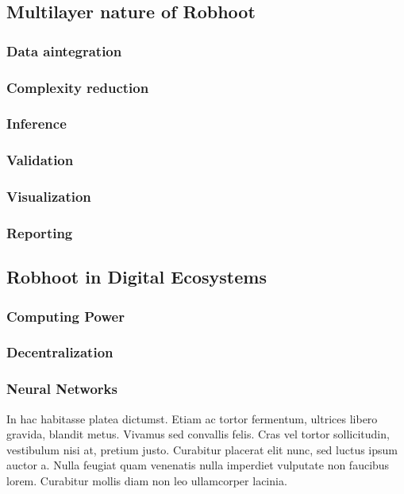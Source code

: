 \documentclass[10pt, a4paper, twocolumn]{article} %
\begin{document}
\subsection{Multilayer nature of Robhoot}

\subsubsection{Data aintegration}
\subsubsection{Complexity reduction}
\subsubsection{Inference}
\subsubsection{Validation}
\subsubsection{Visualization}
\subsubsection{Reporting}

\subsection{Robhoot in Digital Ecosystems}

\subsubsection{Computing Power}
\subsubsection{Decentralization}
\subsubsection{Neural Networks}

In hac habitasse platea dictumst. Etiam ac tortor fermentum, ultrices libero gravida, blandit metus. Vivamus sed convallis felis. Cras vel tortor sollicitudin, vestibulum nisi at, pretium justo. Curabitur placerat elit nunc, sed luctus ipsum auctor a. Nulla feugiat quam venenatis nulla imperdiet vulputate non faucibus lorem. Curabitur mollis diam non leo ullamcorper lacinia.
\end{document}
